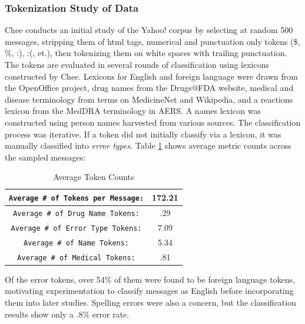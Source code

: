 \documentclass[twoside,11pt]{article}
\begin{document}
\subsubsection{Tokenization Study of Data}
Chee conducts an initial study of the Yahoo! corpus by selecting at random 500 messages, stripping them of html tags, numerical and punctuation only tokens (\$, \%, :), :(, et.), then tokenizing them on white spaces with trailing punctuation. The tokens are evaluated in several rounds of classification using lexicons constructed by Chee. Lexicons for English and foreign language were drawn from the OpenOffice project, drug names from the Drugs@FDA website, medical and disease terminology from terms on MedicineNet and Wikipedia, and a reactions lexicon from the MedDRA terminology in AERS. A names lexicon was constructed using person names harvested from various sources. The classification process was iterative. If a token did not initially classify via a lexicon, it was manually classified into \textit{error types}. Table \ref{table1} shows average metric counts across the sampled messages:
\begin{table}[H]
  \centering
  \caption{Average Token Counts}
  \label{table1}
  \begin{tabular}{||c|c||}
    \hline
    \verb|Average # of Tokens per Message:| & 172.21\\
    \hline
    \verb|Average # of Drug Name Tokens:| & .29\\
    \hline
    \verb|Average # of Error Type Tokens:| & 7.09\\
    \hline
    \verb|Average # of Name Tokens:| & 5.34\\
    \hline
    \verb|Average # of Medical Tokens:| & .81\\
    \hline
  \end{tabular}
\end{table}
Of the error tokens, over 54\% of them were found to be foreign language tokens, motivating experimentation to classify messages as English before incorporating them into later studies. Spelling errors were also a concern, but the classification results show only a $.8\%$ error rate. %
\end{document}
